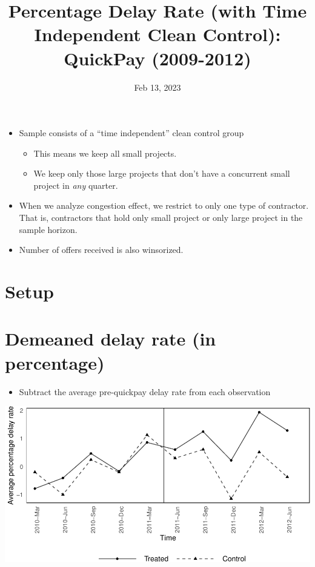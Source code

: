 \documentclass[
]{article}
\title{Percentage Delay Rate (with Time Independent Clean Control):
QuickPay (2009-2012)}
\author{}
\date{\vspace{-2.5em}Feb 13, 2023}
\providecommand{\tightlist}{%
  \setlength{\itemsep}{0pt}\setlength{\parskip}{0pt}}
\begin{document}
\maketitle

\begin{itemize}
\item
  Sample consists of a ``time independent'' clean control group

  \begin{itemize}
  \tightlist
  \item
    This means we keep all small projects.
  \item
    We keep only those large projects that don't have a concurrent small
    project in \emph{any} quarter.
  \end{itemize}
\item
  When we analyze congestion effect, we restrict to only one type of
  contractor. That is, contractors that hold only small project or only
  large project in the sample horizon.
\item
  Number of offers received is also winsorized.
\end{itemize}

\hypertarget{setup}{%
\section{Setup}\label{setup}}

\hypertarget{demeaned-delay-rate-in-percentage}{%
\section{Demeaned delay rate (in
percentage)}\label{demeaned-delay-rate-in-percentage}}

\begin{itemize}
\tightlist
\item
  Subtract the average pre-quickpay delay rate from each observation
\end{itemize}

\includegraphics{qp_first_pc_delay_clean_control_time_independent_files/figure-latex/demeaned_plot_one_type-1.pdf}
\end{document}
